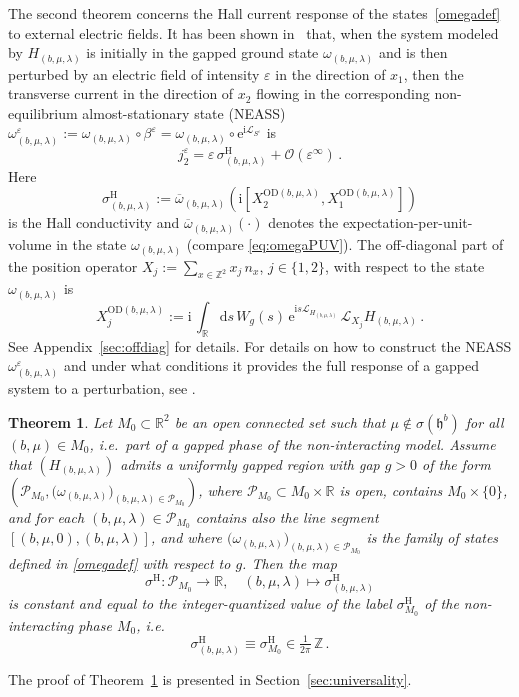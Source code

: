 \documentclass[a4paper]{article}
\newcommand{\e}{\mathrm{e}}
\renewcommand{\i}{\mathrm{i}}
\newcommand{\epsi}{\varepsilon}
\newcommand{\w}{\omega}
\newcommand{\Z}{\mathbb{Z}}
\newcommand{\R}{\mathbb{R}}
\newcommand{\eps}{\varepsilon}
\newcommand{\OD}[1][]{   ^{\mathrm{OD}#1}   }
\newcommand{\mL}{\mathcal{L}}
\newcommand{\mP}{\mathcal{P}}
\theoremstyle{plain}
\newtheorem{theorem}{Theorem}[section]
\theoremstyle{definition}
\theoremstyle{remark}
\renewcommand{\(}{\left(}
\renewcommand{\)}{\right)}
\begin{document}
The second theorem concerns the Hall current response of the states~\eqref{omegadef} to external electric fields. It has been shown in~\cite{WMMMT24} that, when the system modeled by $H_{(b,\mu,\lambda)}$ is initially in the gapped ground state $\w_{(b,\mu,\lambda)}$ and  is then perturbed by an electric field of intensity $\eps$ in the direction of $x_1$, then the transverse current in the direction of $x_2$ flowing in the corresponding non-equilibrium almost-stationary state (NEASS) $\w_{(b,\mu,\lambda)}^{\eps} := \w_{(b,\mu,\lambda)} \circ \beta^\epsi= \w_{(b,\mu,\lambda)} \circ \e^{\i\mL_{S^\epsi}}$ is  
\[ j_2^{\epsi} = \epsi\, \sigma^\mathrm{H}_{(b,\mu,\lambda)} + \mathcal{O}(\epsi^\infty)\,. \]
Here 
\begin{equation} \label{sigmaHdef}
\sigma^\mathrm{H}_{(b,\mu,\lambda)} := \overline{\w}_{(b,\mu,\lambda)}\left(\i \left[X_2\OD[(b,\mu,\lambda)],X_1\OD[(b,\mu,\lambda)]\right]\right) 
\end{equation}
is the Hall conductivity and $\overline{\w}_{(b,\mu,\lambda)}(\cdot)$ denotes the expectation-per-unit-volume in the state $\w_{(b,\mu,\lambda)}$ (compare \eqref{eq:omegaPUV}). The off-diagonal part of the position operator $X_j := \sum_{x \in \Z^2} x_j \, n_{x}$, $j \in \{1, 2\}$, with respect to the state $\w_{(b,\mu,\lambda)}$ is
\begin{equation} \label{ODinformal}
X_j\OD[(b,\mu,\lambda)] := \i \, \int_{\R}\mathrm{d}s \,W_g(s) \, \e^{\i s\mL_{H_{(b,\mu,\lambda)}}}\,  \mL_{X_j} H_{(b,\mu,\lambda)}\,.
\end{equation}
See Appendix~\ref{sec:offdiag} for details.
For details on how to construct the NEASS $\w_{(b,\mu,\lambda)}^{\eps}$ and under what conditions it provides the full response of a gapped system to a perturbation, see \cite{Teufel2020,HT20b,BTW26adiabatic}. 


\begin{theorem}\label{cor:universality}
    Let $M_0 \subset \R^2$ be an open connected set such that 
 $\mu\notin \sigma(\mathfrak{h}^b)$ for all $(b,\mu)\in M_0$, i.e.\ part of a gapped phase of the non-interacting model. Assume that  $(H_{(b,\mu,\lambda)})$ admits a uniformly gapped region with gap $g>0$ of the form $\left( \mathcal{P}_{M_0}, \big(\w_{(b,\mu,\lambda)}\big)_{(b,\mu,\lambda)\in\mathcal{P}_{M_0}} \right)$, where  
$\mathcal{P}_{M_0}\subset M_0\times \R$ is open, contains $M_0\times\{0\}$, and  for each $(b,\mu,\lambda) \in \mathcal{P}_{M_0}$ contains also the line segment $[(b,\mu,0),(b,\mu,\lambda)]$, and where $\big(\w_{(b,\mu,\lambda)}\big)_{(b,\mu,\lambda)\in \mP_{M_0}}$ is the family of states defined in \eqref{omegadef} with respect to $g$. 
    Then the map
    \[
        \sigma^{\mathrm{H}} \colon \mathcal{P}_{M_0} \to \R, \quad (b,\mu,\lambda) \mapsto \sigma^\mathrm{H}_{(b,\mu,\lambda)} 
    \]
    is constant and equal to the integer-quantized value of the label $\sigma^\mathrm{H}_{M_0}$ of the non-interacting phase $M_0$, i.e.
    \[
    \sigma^\mathrm{H}_{(b,\mu,\lambda)}\equiv \sigma^\mathrm{H}_{M_0}\in \tfrac{1}{2\pi}\,\Z \,.
    \]
\end{theorem}
\noindent The proof of Theorem~\ref{cor:universality} is presented in Section~\ref{sec:universality}.
\end{document}
